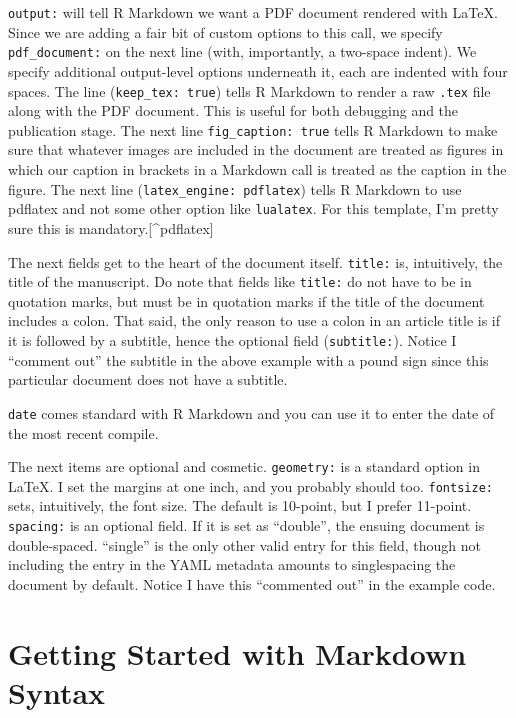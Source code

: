 \documentclass[
  11pt,
]{article}
\begin{document}
\texttt{output:} will tell R Markdown we want a PDF document rendered
with LaTeX. Since we are adding a fair bit of custom options to this
call, we specify \texttt{pdf\_document:} on the next line (with,
importantly, a two-space indent). We specify additional output-level
options underneath it, each are indented with four spaces. The line
(\texttt{keep\_tex:\ true}) tells R Markdown to render a raw
\texttt{.tex} file along with the PDF document. This is useful for both
debugging and the publication stage. The next line
\texttt{fig\_caption:\ true} tells R Markdown to make sure that whatever
images are included in the document are treated as figures in which our
caption in brackets in a Markdown call is treated as the caption in the
figure. The next line (\texttt{latex\_engine:\ pdflatex}) tells R
Markdown to use pdflatex and not some other option like
\texttt{lualatex}. For this template, I'm pretty sure this is
mandatory.{[}\^{}pdflatex{]}

The next fields get to the heart of the document itself. \texttt{title:}
is, intuitively, the title of the manuscript. Do note that fields like
\texttt{title:} do not have to be in quotation marks, but must be in
quotation marks if the title of the document includes a colon. That
said, the only reason to use a colon in an article title is if it is
followed by a subtitle, hence the optional field (\texttt{subtitle:}).
Notice I ``comment out'' the subtitle in the above example with a pound
sign since this particular document does not have a subtitle.

\texttt{date} comes standard with R Markdown and you can use it to enter
the date of the most recent compile.

The next items are optional and cosmetic. \texttt{geometry:} is a
standard option in LaTeX. I set the margins at one inch, and you
probably should too. \texttt{fontsize:} sets, intuitively, the font
size. The default is 10-point, but I prefer 11-point. \texttt{spacing:}
is an optional field. If it is set as ``double'', the ensuing document
is double-spaced. ``single'' is the only other valid entry for this
field, though not including the entry in the YAML metadata amounts to
singlespacing the document by default. Notice I have this ``commented
out'' in the example code.

\hypertarget{getting-started-with-markdown-syntax}{%
\section{Getting Started with Markdown
Syntax}\label{getting-started-with-markdown-syntax}}
\end{document}
